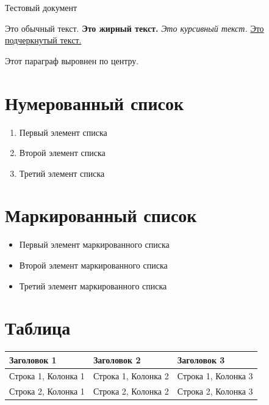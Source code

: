 \documentclass{article}%
\begin{document}
%
\normalsize%
\begin{flushleft}%
Тестовый документ%
\end{flushleft}%
\begin{flushleft}%
Это обычный текст. \textbf{Это жирный текст. }\textit{Это курсивный текст. }\underline{Это подчеркнутый текст. }%
\end{flushleft}%
\begin{center}%
Этот параграф выровнен по центру.%
\end{center}%
\section{Нумерованный список}%
\begin{enumerate}%
\item Первый элемент списка%
\item Второй элемент списка%
\item Третий элемент списка%
\end{enumerate}%
\section{Маркированный список}%
\begin{itemize}%
\item Первый элемент маркированного списка%
\item Второй элемент маркированного списка%
\item Третий элемент маркированного списка%
\end{itemize}%
\section{Таблица}%
\begin{longtable}{|>{\raggedright\arraybackslash}p{5.08cm}|>{\raggedright\arraybackslash}p{5.08cm}|>{\raggedright\arraybackslash}p{5.08cm}|}%
\hline%
Заголовок 1 & Заголовок 2 & Заголовок 3 \\ \hline \endfirsthead%
\hline%
Строка 1, Колонка 1 & Строка 1, Колонка 2 & Строка 1, Колонка 3 \\ \hline%
Строка 2, Колонка 1 & Строка 2, Колонка 2 & Строка 2, Колонка 3 \\ \hline%
\end{longtable}%
\end{document}
